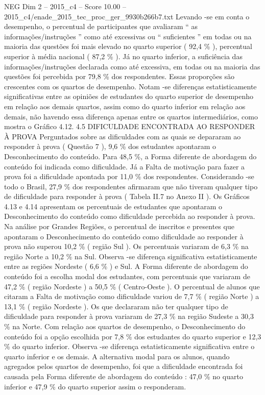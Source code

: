 \begin{textsample}{NEG Dim 2 – 2015\_c4 – Score 10.00 – 2015\_c4/enade\_2015\_tec\_proc\_ger\_9930b266b7.txt}
Levando -se em conta o desempenho, o percentual de participantes que avaliaram “ as informações/instruções ” como até excessivas ou “ suficientes ” em todas ou na maioria das questões foi mais elevado no quarto superior ( 92,4 \% ), percentual superior à média nacional ( 87,2 \% ).
Já no quarto inferior, a suficiência das informações/instruções declarada como até excessiva, em todas ou na maioria das questões foi percebida por 79,8 \% dos respondentes.
Essas proporções são crescentes com os quartos de desempenho.
Notam -se diferenças estatisticamente significativas entre as opiniões de estudantes do quarto superior de desempenho em relação aos demais quartos, assim como do quarto inferior em relação aos demais, não havendo essa diferença apenas entre os quartos intermediários, como mostra o Gráfico 4.12. 4.5 DIFICULDADE ENCONTRADA AO RESPONDER À PROVA Perguntados sobre as dificuldades com as quais se depararam ao responder à prova ( Questão 7 ), 9,6 \% dos estudantes apontaram o Desconhecimento do conteúdo.
Para 48,5 \%, a Forma diferente de abordagem do conteúdo foi indicada como dificuldade.
Já a Falta de motivação para fazer a prova foi a dificuldade apontada por 11,0 \% dos respondentes.
Considerando -se todo o Brasil, 27,9 \% dos respondentes afirmaram que não tiveram qualquer tipo de dificuldade para responder à prova ( Tabela II.7 no Anexo II ).
Os Gráficos 4.13 e 4.14 apresentam os percentuais de estudantes que apontaram o Desconhecimento do conteúdo como dificuldade percebida ao responder à prova.
Na análise por Grandes Regiões, o percentual de inscritos e presentes que apontaram o Desconhecimento do conteúdo como dificuldade ao responder à prova não superou 10,2 \% ( região Sul ).
Os percentuais variaram de 6,3 \% na região Norte a 10,2 \% na Sul.
Observa -se diferença significativa estatisticamente entre as regiões Nordeste ( 6,6 \% ) e Sul.
A Forma diferente de abordagem do conteúdo foi a escolha modal dos estudantes, com percentuais que variaram de 47,2 \% ( região Nordeste ) a 50,5 \% ( Centro-Oeste ).
O percentual de alunos que citaram a Falta de motivação como dificuldade variou de 7,7 \% ( região Norte ) a 13,1 \% ( região Nordeste ).
Os que declararam não ter qualquer tipo de dificuldade para responder à prova variaram de 27,3 \% na região Sudeste a 30,3 \% na Norte.
Com relação aos quartos de desempenho, o Desconhecimento do conteúdo foi a opção escolhida por 7,8 \% dos estudantes do quarto superior e 12,3 \% do quarto inferior.
Observa -se diferença estatisticamente significativa entre o quarto inferior e os demais.
A alternativa modal para os alunos, quando agregados pelos quartos de desempenho, foi que a dificuldade encontrada foi causada pela Forma diferente de abordagem do conteúdo : 47,0 \% no quarto inferior e 47,9 \% do quarto superior assim o responderam.

\end{textsample}
